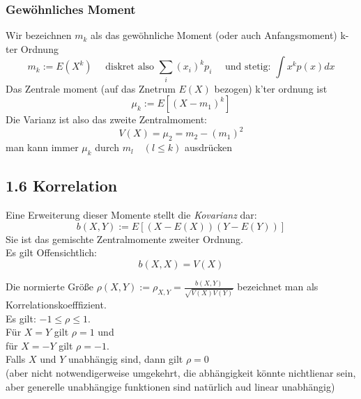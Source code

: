 \documentclass[a4paper]{article}
\theoremstyle{definition}
\theoremstyle{remark}
\begin{document}
 \subsubsection{Gewöhnliches  Moment}
 \label{ssub:weitere_momente}
 
 
  Wir bezeichnen $m_k$ als das gewöhnliche Moment (oder auch Anfangsmoment) k-ter Ordnung
  \begin{equation}
    m_k:= E(X^k) \quad \textrm{ diskret also } \sum_{i}(x_i)^kp_i \quad \textrm{ und stetig: } \int x^k p(x)dx
  \end{equation}
  Das Zentrale moment (auf das Znetrum $E(X)$ bezogen) k'ter ordnung ist 
  \begin{equation}
    \mu_k:= E\left[ \left( X-m_1 \right)^k \right]
  \end{equation}
Die Varianz ist also das zweite Zentralmoment:
\begin{equation}
V(X)=\mu_2=m_2-(m_1)^2
\end{equation}
man kann immer $\mu_k$ durch $m_l\quad (l\leq k)$ ausdrücken

\subsection{1.6 Korrelation}
\label{sub:1_6_korrelation}

Eine Erweiterung dieser Momente stellt die \textit{Kovarianz} dar:
\begin{equation}
b(X,Y):= E\left[ \left( X-E(X) \right)\left( Y-E(Y) \right) \right]
\end{equation}
Sie ist das gemischte Zentralmomente zweiter Ordnung.\\
Es gilt Offensichtlich:
\begin{equation}
  b(X,X)=V(X)
\end{equation}

Die normierte Größe $\rho (X,Y):= \rho _{X,Y}=\frac{b(X,Y)}{\sqrt{V(X)V(Y)}}$ bezeichnet man als Korrelationskoefffizient.\\
Es gilt:
$ -1\leq\rho \leq 1$.\\
Für $X=Y$ gilt $\rho =1$ und\\
für $X=-Y$ gilt $\rho =-1$.\\
Falls $X$ und $Y$ unabhängig sind, dann gilt $\rho =0$\\
(aber nicht notwendigerweise umgekehrt, die abhängigkeit könnte nichtlienar sein, aber generelle unabhängige funktionen sind natürlich aud linear unabhängig)\\
\end{document}
